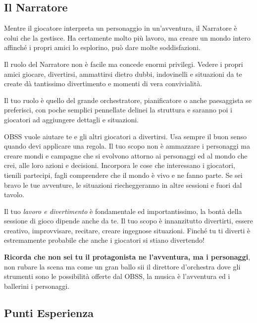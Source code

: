 \begin{multicols}{2}

\subsection{Il Narratore}

\label{il-narratore}

Mentre il giocatore interpreta un personaggio in un'avventura, il Narratore è colui che la gestisce. Ha certamente molto più lavoro, ma creare un mondo intero affinché i propri amici lo esplorino, può dare molte soddisfazioni.

Il ruolo del Narratore non è facile ma concede enormi privilegi. Vedere i propri amici giocare, divertirsi, ammattirsi dietro dubbi, indovinelli e situazioni da te create dà tantissimo divertimento e momenti di vera convivialità.

Il tuo ruolo è quello del grande orchestratore, pianificatore o anche paesaggista se preferisci, con poche semplici pennellate delinei la struttura e saranno poi i giocatori ad aggiungere dettagli e situazioni.

\begin{narratore}
OBSS vuole aiutare te e gli altri giocatori a divertirsi. Usa sempre il buon senso quando devi applicare una regola. Il tuo scopo non è ammazzare i personaggi ma creare mondi e campagne che si evolvono attorno ai personaggi ed al mondo che crei, alle loro azioni e decisioni. Incorpora le cose che interessano i giocatori, tienili partecipi, fagli comprendere che il mondo è vivo e ne fanno parte. Se sei bravo le tue avventure, le situazioni riecheggeranno in altre sessioni e fuori dal tavolo.
\end{narratore}

Il tuo \emph{lavoro e divertimento} è fondamentale ed importantissimo, la bontà della sessione di gioco dipende anche da te. Il tuo scopo è innanzitutto divertirti, essere creativo, improvvisare, recitare, creare ingegnose situazioni. Finché tu ti diverti è estremamente probabile che anche i giocatori si stiano divertendo!

\textbf{Ricorda che non sei tu il protagonista ne l'avventura, ma i personaggi}, non rubare la scena ma come un gran ballo sii il direttore d'orchestra dove gli strumenti sono le possibilità offerte dal OBSS, la musica è l'avventura ed i ballerini i personaggi.

\subsection{Punti Esperienza}


\end{multicols}
